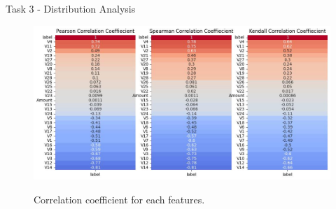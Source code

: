 \documentclass{beamer}
\begin{document}
\begin{frame}{Task 3 - Distribution Analysis}

  \begin{figure}[H]
    \centering
    \includegraphics[width=\textwidth]{../code/Task3/Analysis/corrcoef.jpg} \\
    \caption{Correlation coefficient for each features.}
  \end{figure}

\end{frame}
\end{document}
